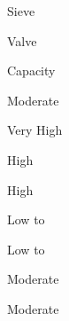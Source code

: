 \documentclass[a4paper,portrait,12pt]{article}
\begin{document}
\begin{flushleft}
Sieve
\end{flushleft}





\begin{flushleft}
Valve
\end{flushleft}





\begin{flushleft}
Capacity
\end{flushleft}





\begin{flushleft}
Moderate
\end{flushleft}





\begin{flushleft}
Very High
\end{flushleft}





\begin{flushleft}
High
\end{flushleft}





\begin{flushleft}
High
\end{flushleft}





\begin{flushleft}
Low to
\end{flushleft}





\begin{flushleft}
Low to
\end{flushleft}





\begin{flushleft}
Moderate
\end{flushleft}





\begin{flushleft}
Moderate
\end{flushleft}
\end{document}
